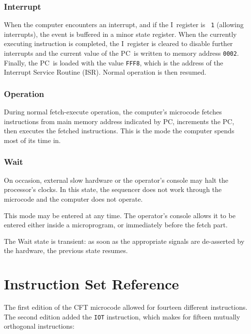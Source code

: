 \documentclass[11pt,a4paper,twocolumns]{article}
\newcommand\register[1]{\textsf{#1}}
\newcommand\Ireg{\register{I}}
\newcommand\PC{\register{PC}}
\begin{document}
\subsubsection{Interrupt}

When the computer encounters an interrupt, and if the \Ireg\ register is {\tt
  1} (allowing interrupts), the event is buffered in a minor state
register. When the currently executing instruction is completed, the
\Ireg\ register is cleared to disable further interrupts and the current value
of the \PC\ is written to memory address {\tt 0002}. Finally, the \PC\ is
loaded with the value {\tt FFF8}, which is the address of the Interrupt Service
Routine (ISR). Normal operation is then resumed.

\subsubsection{Operation}

During normal fetch-execute operation, the computer's microcode
fetches instructions from main memory address indicated by \PC,
increments the \PC, then executes the fetched instructions. This is the
mode the computer spends most of its time in.

\subsubsection{Wait}

On occasion, external slow hardware or the operator's console may halt
the processor's clocks. In this state, the sequencer does not work
through the microcode and the computer does not operate.

This mode may be entered at any time. The operator's console allows it
to be entered either inside a microprogram, or immediately before the
fetch part.

The Wait state is transient: as soon as the appropriate signals are
de-asserted by the hardware, the previous state resumes.

\section{Instruction Set Reference}

The first edition of the CFT microcode allowed for fourteen different
instructions. The second edition added the {\tt IOT} instruction,
which makes for fifteen mutually orthogonal instructions:
\end{document}
